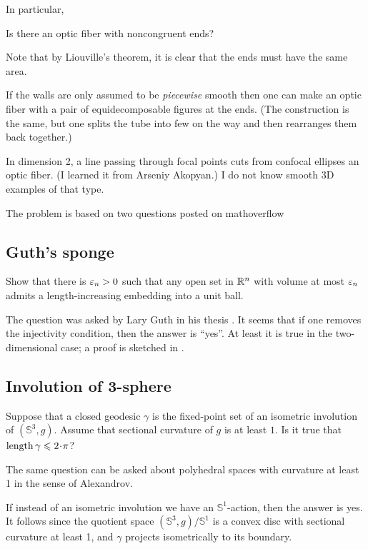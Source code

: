 In particular, 

\begin{pr}
Is there an optic fiber with noncongruent ends?
\end{pr}

Note that by  Liouville's theorem, it is clear that the ends must have the same area.

If the walls are only assumed to be \emph{piecewise} smooth then one can make an optic fiber with a pair of equidecomposable figures at the ends.
(The construction is the same, but one splits the tube into few on the way and then rearranges them back together.) 

In dimension 2, a line passing through focal points cuts from confocal ellipses an optic fiber. (I learned it from Arseniy Akopyan.)  I do not know smooth 3D examples of that type.

The problem is based on two questions posted on mathoverflow \cite{rourke-optic, petrunin-optic}

\subsection*{Guth's sponge}

\begin{pr}
Show that there is $\varepsilon_n>0$ such that any open set in $\mathbb{R}^n$ with volume at most $\varepsilon_n$ admits a length-increasing embedding into a unit ball.
\end{pr}

The question was asked by Lary Guth in his thesis \cite{guth-2005}.
It seems that if one removes the injectivity condition, then the answer is ``yes''.
At least it is true in the two-dimensional case; a proof is sketched in \cite{petrunin-guth}.

\subsection*{Involution of 3-sphere}

\begin{pr}
Suppose that a closed geodesic $\gamma$ is the fixed-point set of an isometric involution of $(\mathbb{S}^3,g)$.
Assume that sectional curvature of $g$ is at least $1$.
Is it true that $\length\gamma\le2\cdot\pi$?
\end{pr}

The same question can be asked about polyhedral spaces with curvature at least 1 in the sense of Alexandrov.

If instead of an isometric involution we have an $\mathbb{S}^1$-action, then the answer is yes.
It follows since the quotient space $(\mathbb{S}^3,g)/\mathbb{S}^1$ is a convex disc with sectional curvature at least 1,
and $\gamma$ projects isometrically to its boundary.

